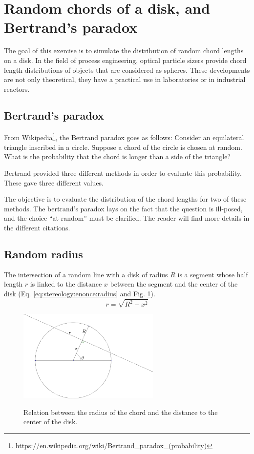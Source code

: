\section{Random chords of a disk, and Bertrand's paradox}

The goal of this exercise is to simulate the distribution of random chord lengths on a disk. In the field of process engineering, optical particle sizers provide chord length distributions of objects that are considered as spheres. These developments are not only theoretical, they have a practical use in laboratories or in industrial reactors.

\subsection{Bertrand's paradox}
From Wikipedia\footnote{https://en.wikipedia.org/wiki/Bertrand\_paradox\_(probability)}, the Bertrand paradox goes as follows: Consider an equilateral triangle inscribed in a circle. Suppose a chord of the circle is chosen at random. What is the probability that the chord is longer than a side of the triangle?

Bertrand provided three different methods in order to evaluate this probability. These gave three different values. 

\begin{rmq}The objective is to evaluate the distribution of the chord lengths for two of these methods. The bertrand's paradox lays on the fact that the question is ill-posed, and the choice ``at random'' must be clarified. The reader will find more details in the different citations.
\end{rmq}


\subsection{Random radius}
The intersection of a random line with a disk of radius $R$ is a segment whose half length $r$ is linked to the distance $x$ between the segment and the center of the disk (Eq. \ref{eq:stereology:enonce:radius} and Fig. \ref{fig:stereology:enonce:disk}). 
\begin{equation}
r=\sqrt{R^2-x^2} \label{eq:stereology:enonce:radius}
\end{equation}

\begin{figure}[H]
\centering\caption{Relation between the radius of the chord and the distance to the center of the disk.}%
%
\includegraphics[width=7cm]{section_diskT.png}%
\label{fig:stereology:enonce:disk}%
\end{figure}

